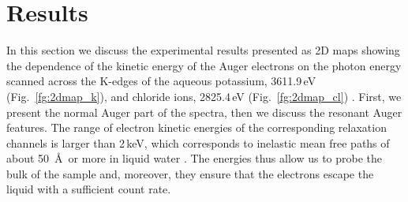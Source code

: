 \section{Results}\label{sec:results}

%


In this section we discuss the experimental results presented as 2D maps showing the dependence of the kinetic energy of the Auger electrons on the photon energy scanned across the K-edges of the aqueous potassium, 3611.9\,eV (Fig.\ \ref{fg:2dmap_k}), and chloride ions, 2825.4\,eV (Fig.\ \ref{fg:2dmap_cl}) \citep{ceolin17}. First, we present the normal Auger part of the spectra, then we discuss the resonant Auger features. The range of electron kinetic energies of the corresponding relaxation channels is larger than 2\,keV, which corresponds to inelastic mean free paths of about 50~\AA~or more in liquid water \citep{emfiet09:45}. The energies thus allow us to probe the bulk of the sample and, moreover, they ensure that the electrons escape the liquid with a sufficient count rate.




